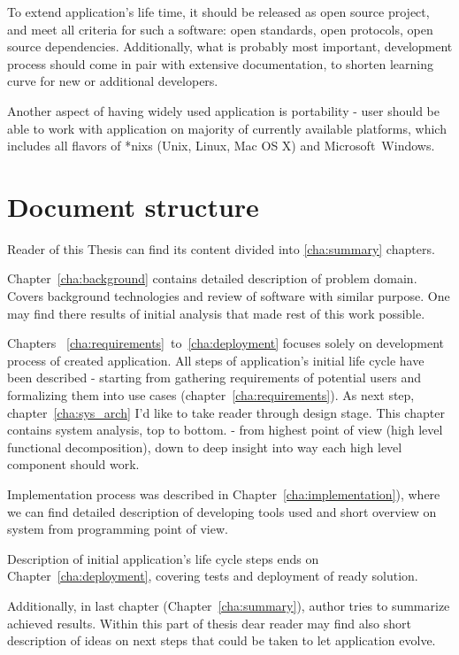 To extend application's life time, it should be released as open source project, and meet all criteria for such a software: open standards, open protocols, open source dependencies. Additionally, what is probably most important, development process should come in pair with extensive documentation, to shorten learning curve for new or additional developers.

Another aspect of having widely used application is portability - user should be able to work with application on majority of currently available platforms, which includes all flavors of *nixs (Unix, Linux, Mac OS X\textregistered) and Microsoft\textregistered~Windows\textregistered. 


\section{Document structure}
\label{ch1:docStructure}

Reader of this Thesis can find its content divided into \ref{cha:summary} chapters. 

Chapter~\ref{cha:background} contains detailed description of problem domain. Covers background technologies and review
of software
with similar purpose. One may find there results of initial analysis that made rest of this work possible.

Chapters ~\ref{cha:requirements}~to~\ref{cha:deployment} focuses solely on development process of created application. All steps of application's initial life cycle have been described - starting from gathering requirements of potential users and formalizing them into use cases (chapter~\ref{cha:requirements}). As next step, chapter~\ref{cha:sys_arch} I'd like to take reader through design stage. This chapter contains system analysis, top to bottom. - from highest point of view (high level functional decomposition), down to deep insight into way each high level component should work. 

Implementation process was described in Chapter~\ref{cha:implementation}), where we can find detailed description of developing tools used and short overview on system from programming point of view.

Description of initial application's life cycle steps ends on Chapter~\ref{cha:deployment}, covering tests and
deployment of ready solution.

Additionally, in last chapter (Chapter~\ref{cha:summary}), author tries to summarize achieved results. Within this part of thesis dear reader may find also short description of ideas on next steps that could be taken to let application evolve.




